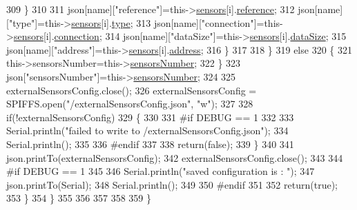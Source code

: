 \begin{DoxyCode}
309                     \}
310                                             
311                     json[name][\textcolor{stringliteral}{"reference"}]=this->\hyperlink{classExternalSensors_a284233f884fcf00154a44740cf1d9e1e}{sensors}[i].\hyperlink{structExternalSensors_1_1sensor_afed5bdfd49732202a368b600cb8396fe}{reference};
312                     json[name][\textcolor{stringliteral}{"type"}]=this->\hyperlink{classExternalSensors_a284233f884fcf00154a44740cf1d9e1e}{sensors}[i].\hyperlink{structExternalSensors_1_1sensor_a6acfdb02c742c2110d7bd2b5d9fce9e7}{type};
313                     json[name][\textcolor{stringliteral}{"connection"}]=this->\hyperlink{classExternalSensors_a284233f884fcf00154a44740cf1d9e1e}{sensors}[i].\hyperlink{structExternalSensors_1_1sensor_ae3c8c1da809f2238bc9abde37a6c6022}{connection};
314                     json[name][\textcolor{stringliteral}{"dataSize"}]=this->\hyperlink{classExternalSensors_a284233f884fcf00154a44740cf1d9e1e}{sensors}[i].\hyperlink{structExternalSensors_1_1sensor_ae9c669bb93befbe4b333920e7f357b80}{dataSize};
315                     json[name][\textcolor{stringliteral}{"address"}]=this->\hyperlink{classExternalSensors_a284233f884fcf00154a44740cf1d9e1e}{sensors}[i].\hyperlink{structExternalSensors_1_1sensor_a8d70ca58524521ed054fc6b81eb58d34}{address};
316                 \}
317  
318             \}
319             \textcolor{keywordflow}{else}
320             \{
321                 this->sensorsNumber=this->\hyperlink{classExternalSensors_a58e4fbf9adeae787d92be5fa33043b5d}{sensorsNumber};
322             \}
323             json[\textcolor{stringliteral}{"sensorsNumber"}]=this->\hyperlink{classExternalSensors_a58e4fbf9adeae787d92be5fa33043b5d}{sensorsNumber};
324 
325             externalSensorsConfig.close();
326             externalSensorsConfig = SPIFFS.open(\textcolor{stringliteral}{"/externalSensorsConfig.json"}, \textcolor{stringliteral}{"w"});
327 
328             \textcolor{keywordflow}{if}(!externalSensorsConfig)
329             \{
330             
331 \textcolor{preprocessor}{            #if DEBUG == 1 }
332 
333                 Serial.println(\textcolor{stringliteral}{"failed to write to /externalSensorsConfig.json"});
334                 Serial.println();
335             
336 \textcolor{preprocessor}{            #endif}
337 
338                 \textcolor{keywordflow}{return}(\textcolor{keyword}{false});
339             \}
340             
341             json.printTo(externalSensorsConfig);
342             externalSensorsConfig.close();
343             
344 \textcolor{preprocessor}{        #if DEBUG == 1 }
345 
346             Serial.println(\textcolor{stringliteral}{"saved configuration is : "});
347             json.printTo(Serial);
348             Serial.println();
349         
350 \textcolor{preprocessor}{        #endif}
351 
352             \textcolor{keywordflow}{return}(\textcolor{keyword}{true}); 
353         \}
354     \}   
355     
356 
357 
358 
359 \}
\end{DoxyCode}
